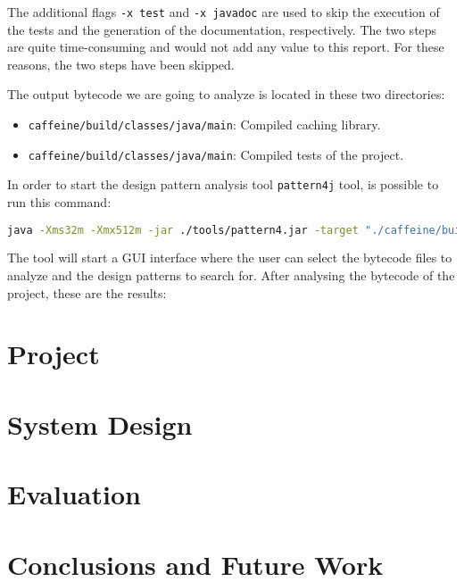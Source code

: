 \documentclass[a4paper, 11pt]{article}
\begin{document}
\noindent The additional flags \texttt{-x test} and \texttt{-x javadoc} are used to skip the execution of the tests and the generation of the documentation, respectively. The two steps are quite time-consuming and would not add any value to this report. For these reasons, the two steps have been skipped.

The output bytecode we are going to analyze is located in these two directories:

\begin{itemize}
  \item \texttt{caffeine/build/classes/java/main}: Compiled caching library.
  \item \texttt{caffeine/build/classes/java/main}: Compiled tests of the project.
\end{itemize}

\noindent In order to start the design pattern analysis tool \texttt{pattern4j} tool, is possible to run this command:

\begin{lstlisting}[language=bash, caption={Bash command to start the pattern4j design pattern analysis tool}]
              java -Xms32m -Xmx512m -jar ./tools/pattern4.jar -target "./caffeine/build/classes/java/main" -target "./caffeine/build/classes/java/test"
\end{lstlisting}

\noindent The tool will start a GUI interface where the user can select the bytecode files to analyze and the design patterns to search for. After analysing the bytecode of the project, these are the results:

\pagebreak

\section{Project}

\pagebreak

\section{System Design}

\pagebreak

\section{Evaluation}

\pagebreak

\section{Conclusions and Future Work}

\printbibliography
\end{document}
